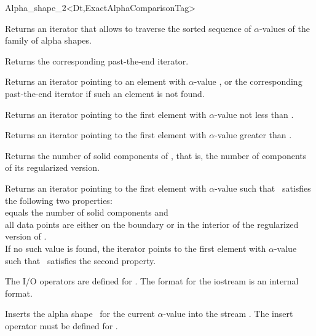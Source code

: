 \begin{ccRefClass} {Alpha_shape_2<Dt,ExactAlphaComparisonTag>}

{Returns an iterator that allows to traverse the
sorted sequence of $\alpha$-values of the family of alpha shapes.}

{Returns the corresponding past-the-end iterator.}

{Returns an iterator pointing to an element with $\alpha$-value
, or the corresponding past-the-end iterator if such 
an element is not found.}

{Returns an iterator pointing to the first element with
$\alpha$-value not less than .}

{Returns an iterator pointing to the first element with $\alpha$-value
greater than .}


{Returns the number of solid components of \ccVar, that is, the number of
components of its 
regularized version.}

{Returns an iterator pointing to the first element with $\alpha$-value
such that \ccVar\ satisfies the following two properties:\\
 equals the number of solid components and \\
all data points are either on the boundary or in the interior of the regularized version of \ccVar.\\
If no such value is found, the iterator points to the first element with 
$\alpha$-value such that \ccVar\ satisfies the second property.}


The I/O operators are defined for . The format for the iostream
is an internal format. 


{Inserts the alpha shape \ccVar\ for the current $\alpha$-value into the stream .
\ccPrecond The insert operator must be defined for .}



\end{ccRefClass}
